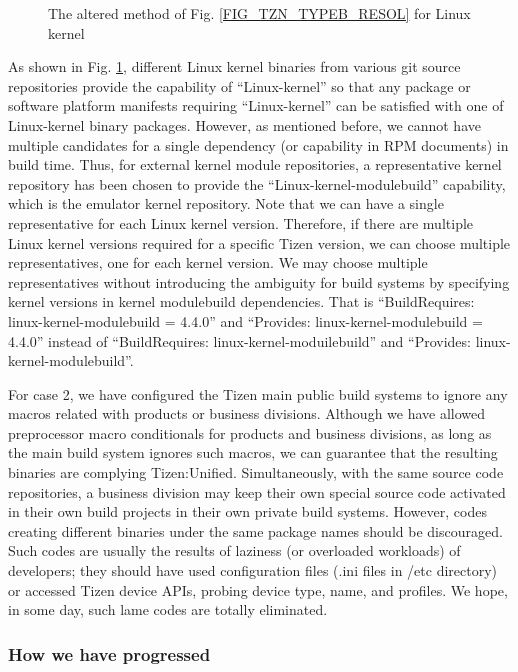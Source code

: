 \begin{figure}
\label{FIG_TZN_KERNELDEP}
\caption{The altered method of Fig. \ref{FIG_TZN_TYPEB_RESOL} for Linux kernel}
\end{figure}

As shown in Fig. \ref{FIG_TZN_KERNELDEP}, different Linux kernel binaries from various git source repositories provide the capability of “Linux-kernel” so that any package or software platform manifests requiring “Linux-kernel” can be satisfied with one of Linux-kernel binary packages. However, as mentioned before, we cannot have multiple candidates for a single dependency (or capability in RPM documents) in build time. Thus, for external kernel module repositories, a representative kernel repository has been chosen to provide the “Linux-kernel-modulebuild” capability, which is the emulator kernel repository. Note that we can have a single representative for each Linux kernel version. Therefore, if there are multiple Linux kernel versions required for a specific Tizen version, we can choose multiple representatives, one for each kernel version. We may choose multiple representatives without introducing the ambiguity for build systems by specifying kernel versions in kernel modulebuild dependencies. That is “BuildRequires: linux-kernel-modulebuild = 4.4.0” and “Provides: linux-kernel-modulebuild = 4.4.0” instead of “BuildRequires: linux-kernel-moduilebuild” and “Provides: linux-kernel-modulebuild”.


For case 2, we have configured the Tizen main public build systems to ignore any macros related with products or business divisions. Although we have allowed preprocessor macro conditionals for products and business divisions, as long as the main build system ignores such macros, we can guarantee that the resulting binaries are complying Tizen:Unified. Simultaneously, with the same source code repositories, a business division may keep their own special source code activated in their own build projects in their own private build systems. However, codes creating different binaries under the same package names should be discouraged. Such codes are usually the results of laziness (or overloaded workloads) of developers; they should have used configuration files (.ini files in /etc directory) or accessed Tizen device APIs, probing device type, name, and profiles. We hope, in some day, such lame codes are totally eliminated.


\subsubsection{How we have progressed}

